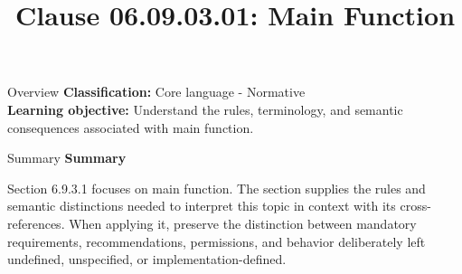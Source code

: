\documentclass[10pt,letterpaper]{article}
\title{Clause 06.09.03.01: Main Function}
\author{}
\date{}
\begin{document}
\maketitle
\begin{CornellOverviewBox}{Overview}
\textbf{Classification:} Core language - Normative\\[2pt]
\textbf{Learning objective:} Understand the rules, terminology, and semantic consequences associated with main function.
\end{CornellOverviewBox}\begin{CornellSummaryBox}{Summary}
{\sffamily\bfseries\color{Accent} Summary}\par\vspace{3pt}Section 6.9.3.1 focuses on main function. The section supplies the rules and semantic distinctions needed to interpret this topic in context with its cross-references. When applying it, preserve the distinction between mandatory requirements, recommendations, permissions, and behavior deliberately left undefined, unspecified, or implementation-defined.
\end{CornellSummaryBox}
\end{document}
